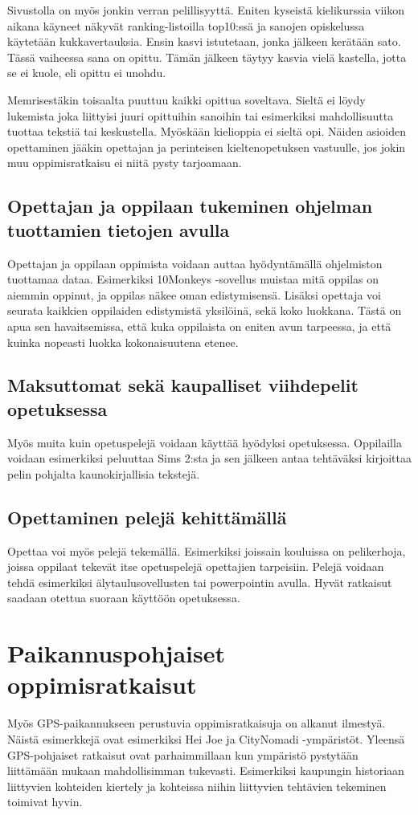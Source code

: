 \documentclass[utf8,bachelor]{gradu3}
\begin{document}
Sivustolla on myös jonkin verran pelillisyyttä. Eniten kyseistä kielikurssia viikon aikana käyneet näkyvät ranking-listoilla top10:ssä ja sanojen opiskelussa käytetään kukkavertauksia. Ensin kasvi istutetaan, jonka jälkeen kerätään sato. Tässä vaiheessa sana on opittu. Tämän jälkeen täytyy kasvia vielä kastella, jotta se ei kuole, eli opittu ei unohdu. 

Memrisestäkin toisaalta puuttuu kaikki opittua soveltava. Sieltä ei löydy lukemista joka liittyisi juuri opittuihin sanoihin tai esimerkiksi mahdollisuutta tuottaa tekstiä tai keskustella. Myöskään kielioppia ei sieltä opi. Näiden asioiden opettaminen jääkin opettajan ja perinteisen kieltenopetuksen vastuulle, jos jokin muu oppimisratkaisu ei niitä pysty tarjoamaan.

\subsection{Opettajan ja oppilaan tukeminen ohjelman tuottamien tietojen avulla}
Opettajan ja oppilaan oppimista voidaan auttaa hyödyntämällä ohjelmiston tuottamaa dataa. Esimerkiksi 10Monkeys -sovellus muistaa mitä oppilas on aiemmin oppinut, ja oppilas näkee oman edistymisensä. Lisäksi opettaja voi seurata kaikkien oppilaiden edistymistä yksilöinä, sekä koko luokkana. Tästä on apua sen havaitsemissa, että kuka oppilaista on eniten avun tarpeessa, ja että kuinka nopeasti luokka kokonaisuutena etenee.

\subsection{Maksuttomat sekä kaupalliset viihdepelit opetuksessa}
Myös muita kuin opetuspelejä voidaan käyttää hyödyksi opetuksessa. Oppilailla voidaan esimerkiksi peluuttaa Sims 2:sta ja sen jälkeen antaa tehtäväksi kirjoittaa pelin pohjalta kaunokirjallisia tekstejä. \parencite[][41-43]{laatua}

\subsection{Opettaminen pelejä kehittämällä}
Opettaa voi myös pelejä tekemällä. Esimerkiksi joissain kouluissa on pelikerhoja, joissa oppilaat tekevät itse opetuspelejä opettajien tarpeisiin. Pelejä voidaan tehdä esimerkiksi älytaulusovellusten tai powerpointin avulla. Hyvät ratkaisut saadaan otettua suoraan käyttöön opetuksessa. \parencite[][]{peleja}


\section{Paikannuspohjaiset oppimisratkaisut}
Myös GPS-paikannukseen perustuvia oppimisratkaisuja on alkanut ilmestyä. Näistä esimerkkejä ovat esimerkiksi Hei Joe ja CityNomadi -ympäristöt. Yleensä GPS-pohjaiset ratkaisut ovat parhaimmillaan kun ympäristö pystytään liittämään mukaan mahdollisimman tukevasti. Esimerkiksi kaupungin historiaan liittyvien kohteiden kiertely ja kohteissa niihin liittyvien tehtävien tekeminen toimivat hyvin.
\end{document}
